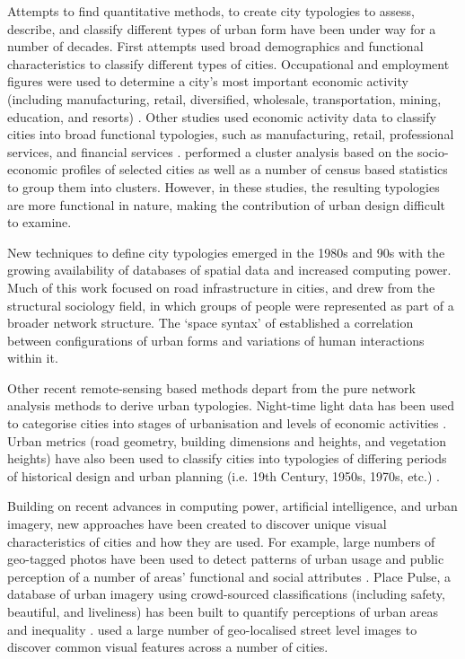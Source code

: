 \documentclass[urbansci,article,submit,moreauthors,pdftex]{Definitions/mdpi}
\begin{document}
Attempts to find quantitative methods, to create city typologies to assess, describe, and classify different types of urban form have been under way for a number of decades. First attempts used broad demographics and functional characteristics to classify different types of cities. Occupational and employment figures were used to determine a city's most important economic activity (including manufacturing, retail, diversified, wholesale, transportation, mining, education, and resorts) \citep{Harris1943}. Other studies used economic activity data to classify cities into broad functional typologies, such as manufacturing, retail, professional services, and financial services \citep{Nelson1955}. \citet{Bruce1971} performed a cluster analysis based on the socio-economic profiles of selected cities as well as a number of census based statistics to group them into clusters. However, in these studies, the resulting typologies are more functional in nature, making the contribution of urban design difficult to examine.

New techniques to define city typologies emerged in the 1980s and 90s with the growing availability of databases of spatial data and increased computing power. Much of this work focused on road infrastructure in cities, and drew from the structural sociology field, in which groups of people were represented as part of a broader network structure. The `space syntax' of \citet{Hillier1996} established a correlation between configurations of urban forms and variations of human interactions within it. 

Other recent remote-sensing based methods depart from the pure network analysis methods to derive urban typologies. Night-time light data has been used to categorise cities into stages of urbanisation and levels of economic activities \citep{Zhang2013}. Urban metrics (road geometry, building dimensions and heights, and vegetation heights) have also been used to classify cities into typologies of differing periods of historical design and urban planning (i.e. 19th Century, 1950s, 1970s, etc.) \citep{Hermosilla2014}.

Building on recent advances in computing power, artificial intelligence, and urban imagery, new approaches have been created to discover unique visual characteristics of cities and how they are used. For example, large numbers of geo-tagged photos have been used to detect patterns of urban usage and public perception of a number of areas' functional and social attributes \citep{Liu2016,Zhou2014a}. Place Pulse, a database of urban imagery using crowd-sourced classifications (including safety, beautiful, and liveliness) has been built to quantify perceptions of urban areas \citep{Dubey2016,Naik2014} and inequality \citep{Salesses2013}. \citet{Doersch2012} used a large number of geo-localised street level images to discover common visual features across a number of cities.
\end{document}
